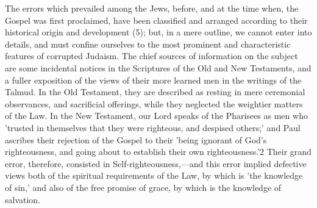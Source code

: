 \documentclass[
]{book}
\begin{document}
The errors which prevailed among the Jews, before, and at the time when, the Gospel was first proclaimed, have been classified and arranged according to their historical origin and development (5); but, in a mere outline, we cannot enter into details, and must confine ourselves to the most prominent and characteristic features of corrupted Judaism. The chief sources of information on the subject are some incidental notices in the Scriptures of the Old and New Testaments, and a fuller exposition of the views of their more learned men in the writings of the Talmud. In the Old Testament, they are described as resting in mere ceremonial observances, and sacrificial offerings, while they neglected the weightier matters of the Law. In the New Testament, our Lord speaks of the Pharisees as men who 'trusted in themselves that they were righteous, and despised others;' and Paul ascribes their rejection of the Gospel to their 'being ignorant of God's righteousness, and going about to establish their own righteousness.'2 Their grand error, therefore, consisted in Self-righteousness,---and this error implied defective views both of the spiritual requirements of the Law, by which is 'the knowledge of sin,' and also of the free promise of grace, by which is the knowledge of salvation.
\end{document}

